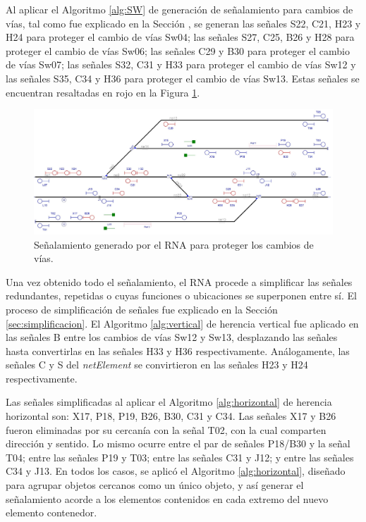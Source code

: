 	Al aplicar el Algoritmo \ref{alg:SW} de generación de señalamiento para cambios de vías, tal como fue explicado en la Sección \label{sec:signal_switches}, se generan las señales S22, C21, H23 y H24 para proteger el cambio de vías Sw04; las señales S27, C25, B26 y H28 para proteger el cambio de vías Sw06; las señales C29 y B30 para proteger el cambio de vías Sw07; las señales S32, C31 y H33 para proteger el cambio de vías Sw12 y las señales S35, C34 y H36 para proteger el cambio de vías Sw13. Estas señales se encuentran resaltadas en rojo en la Figura \ref{fig:EJ1_6}.
	
	\begin{figure}[H]
		\centering
		\includegraphics[width=1\textwidth]{resultados-obtenidos/ejemplo1/images/1_step4.png}
		\centering\caption{Señalamiento generado por el RNA para proteger los cambios de vías.}
		\label{fig:EJ1_6}
	\end{figure}
	
	Una vez obtenido todo el señalamiento, el RNA procede a simplificar las señales redundantes, repetidas o cuyas funciones o ubicaciones se superponen entre sí. El proceso de simplificación de señales fue explicado en la Sección \ref{sec:simplificacion}. El Algoritmo \ref{alg:vertical} de herencia vertical fue aplicado en las señales B entre los cambios de vías Sw12 y Sw13, desplazando las señales hasta convertirlas en las señales H33 y H36 respectivamente. Análogamente, las señales C y S del \textit{netElement} se convirtieron en las señales H23 y H24 respectivamente.
	
	Las señales simplificadas al aplicar el Algoritmo \ref{alg:horizontal} de herencia horizontal son: X17, P18, P19, B26, B30, C31 y C34. Las señales X17 y B26 fueron eliminadas por su cercanía con la señal T02, con la cual comparten dirección y sentido. Lo mismo ocurre entre el par de señales P18/B30 y la señal T04; entre las señales P19 y T03; entre las señales C31 y J12; y entre las señales C34 y J13. En todos los casos, se aplicó el Algoritmo \ref{alg:horizontal}, diseñado para agrupar objetos cercanos como un único objeto, y así generar el señalamiento acorde a los elementos contenidos en cada extremo del nuevo elemento contenedor.
	

